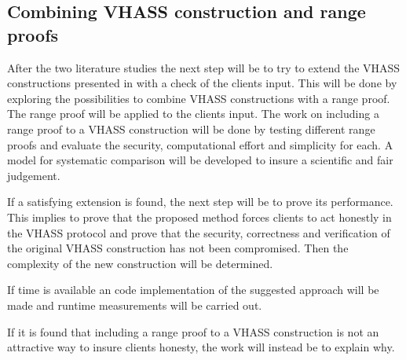 \documentclass[12pt,a4paper]{article}
\begin{document}
\subsection{Combining VHASS construction and range proofs}
After the two literature studies the next step will be to try to extend the VHASS constructions presented in \cite{Georgia-orginal} with a check of the clients input. This will be done by exploring the possibilities to combine VHASS constructions with a range proof. The range proof will be applied to the clients input. The work on including a range proof to a VHASS construction will be done by testing different range proofs and evaluate the security, computational effort and simplicity for each. A model for systematic comparison will be developed to insure a scientific and fair judgement.

If a satisfying extension is found, the next step will be to prove its performance. This implies to prove that the proposed method forces clients to act honestly in the VHASS protocol and prove that the security, correctness and verification of the original VHASS construction has not been compromised. Then the complexity of the new construction will be determined.

If time is available an code implementation of the suggested approach will be made and runtime measurements will be carried out. 

If it is found that including a range proof to a VHASS construction is not
an attractive way to insure clients honesty, the work will instead be to explain why.
\end{document}

